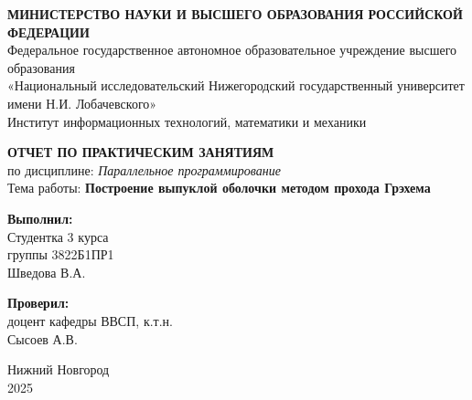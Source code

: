 \documentclass[12pt,a4paper]{extarticle}
\begin{document}
\begin{titlepage}
\begin{center}

\onehalfspacing

\begin{center}
    \textbf{МИНИСТЕРСТВО НАУКИ И ВЫСШЕГО ОБРАЗОВАНИЯ РОССИЙСКОЙ ФЕДЕРАЦИИ} \\
    Федеральное государственное автономное образовательное учреждение высшего образования \\
    «Национальный исследовательский Нижегородский государственный университет имени Н.И. Лобачевского» \\
    Институт информационных технологий, математики и механики
\end{center}

\vspace{3.5cm}

\begin{center}
    \textbf{ОТЧЕТ ПО ПРАКТИЧЕСКИМ ЗАНЯТИЯМ} \vspace{0.5cm}\\
    по дисциплине: \textit{Параллельное программирование} \vspace{0.5cm}\\
    Тема работы: \textbf{Построение выпуклой оболочки методом прохода Грэхема}
\end{center}

\vspace{3.5cm}

\begin{flushright}
    \textbf{Выполнил:} \\
    Студентка 3 курса \\
    группы 3822Б1ПР1 \\
    Шведова В.А. \\

    \vspace{1cm}

    \textbf{Проверил:} \\
    доцент кафедры ВВСП, к.т.н. \\
    Сысоев А.В.
\end{flushright}

\vfill

\begin{center}
    Нижний Новгород\\
    2025
\end{center}

\end{center}
\end{titlepage}
\end{document}
